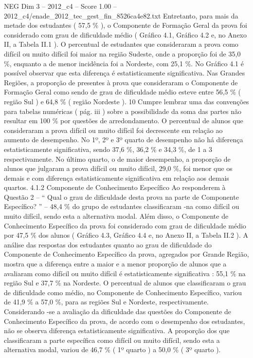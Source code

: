 \begin{textsample}{NEG Dim 3 – 2012\_c4 – Score 1.00 – 2012\_c4/enade\_2012\_tec\_gest\_fin\_8526ca4e82.txt}
Entretanto, para mais da metade dos estudantes ( 57,5 \% ), o Componente de Formação Geral da prova foi considerado com grau de dificuldade médio ( Gráfico 4.1, Gráfico 4.2 e, no Anexo II, a Tabela II.1 ).
O percentual de estudantes que consideraram a prova como difícil ou muito difícil foi maior na região Sudeste, onde a proporção foi de 35,0 \%, enquanto a de menor incidência foi a Nordeste, com 25,1 \%.
No Gráfico 4.1 é possível observar que esta diferença é estatisticamente significativa.
Nas Grandes Regiões, a proporção de presentes à prova que consideraram o Componente de Formação Geral como sendo de grau de dificuldade médio esteve entre 56,5 \% ( região Sul ) e 64,8 \% ( região Nordeste ). 10 Cumpre lembrar uma das convenções para tabelas numéricas ( pág. iii ) sobre a possibilidade da soma das partes não resultar em 100 \% por questões de arredondamento.
O percentual de alunos que consideraram a prova difícil ou muito difícil foi decrescente em relação ao aumento de desempenho.
No 1º, 2º e 3º quarto de desempenho não há diferença estatisticamente significativa, sendo 37,6 \%, 36,2 \% e 34,3 \%, de 1 a 3 respectivamente.
No último quarto, o de maior desempenho, a proporção de alunos que julgaram a prova difícil ou muito difícil, 29,0 \%, foi menor que os demais e com diferença estatisticamente significativa em relação aos demais quartos. 4.1.2 Componente de Conhecimento Específico Ao responderem à Questão 2 – “ Qual o grau de dificuldade desta prova na parte de Componente Específico? ” – 48,4 \% do grupo de estudantes classificaram -na como difícil ou muito difícil, sendo esta a alternativa modal.
Além disso, o Componente de Conhecimento Específico da prova foi considerado com grau de dificuldade médio por 47,5 \% dos alunos ( Gráfico 4.3, Gráfico 4.4 e, no Anexo II, a Tabela II.2 ).
A análise das respostas dos estudantes quanto ao grau de dificuldade do Componente de Conhecimento Específico da prova, agregados por Grande Região, mostra que a diferença entre a maior e a menor proporção de alunos que a avaliaram como difícil ou muito difícil é estatisticamente significativa : 55,1 \% na região Sul e 37,7 \% na Nordeste.
O percentual de alunos que classificaram o grau de dificuldade como médio, no Componente de Conhecimento Específico, variou de 41,9 \% a 57,0 \%, para as regiões Sul e Nordeste, respectivamente.
Considerando -se a avaliação da dificuldade das questões do Componente de Conhecimento Específico da prova, de acordo com o desempenho dos estudantes, não se observa diferença estatisticamente significativa.
A proporção dos que classificaram a parte específica como difícil ou muito difícil, sendo esta a alternativa modal, variou de 46,7 \% ( 1º quarto ) a 50,0 \% ( 3º quarto ).

\end{textsample}
